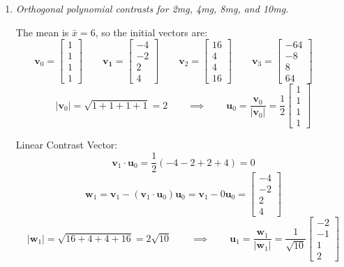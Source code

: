 \documentclass[11pt]{article}
\begin{document}
\begin{enumerate}
\pagebreak
\item %
\emph{Orthogonal polynomial contrasts for 2mg, 4mg, 8mg, and 10mg.}

The mean is \(\bar{x}=6\), so the initial vectors are:
\begin{equation*}
\mathbf{v}_0=\begin{bmatrix}1 \\ 1 \\ 1 \\ 1\end{bmatrix}\qquad
\mathbf{v_1}=\begin{bmatrix}-4 \\ -2 \\ 2 \\ 4\end{bmatrix}\qquad
\mathbf{v}_2=\begin{bmatrix}16 \\ 4 \\ 4 \\ 16\end{bmatrix}\qquad
\mathbf{v}_3=\begin{bmatrix}-64 \\ -8 \\ 8 \\ 64\end{bmatrix}\qquad
\end{equation*}
\begin{equation*}
|\mathbf{v}_0|=\sqrt{1+1+1+1}=2\qquad\implies\qquad
\mathbf{u}_0=\frac{\mathbf{v}_0}{|\mathbf{v}_0|}=\frac{1}{2}\begin{bmatrix}1 \\ 1 \\ 1 \\ 1\end{bmatrix}
\end{equation*}

Linear Contrast Vector:
\begin{equation*}
\mathbf{v}_1\cdot\mathbf{u}_0=\frac{1}{2}(-4-2+2+4)=0
\end{equation*}
\begin{equation*}
\mathbf{w}_1=\mathbf{v}_1-(\mathbf{v}_1\cdot\mathbf{u}_0)\mathbf{u}_0=\mathbf{v}_1-0\mathbf{u}_0=\begin{bmatrix}-4 \\ -2 \\ 2 \\ 4\end{bmatrix}
\end{equation*}
\begin{equation*}
|\mathbf{w}_1|=\sqrt{16+4+4+16}=2\sqrt{10}\qquad\implies\qquad
\mathbf{u}_1=\frac{\mathbf{w}_1}{|\mathbf{w}_1|}=\frac{1}{\sqrt{10}}\begin{bmatrix}-2 \\ -1 \\ 1 \\ 2\end{bmatrix}
\end{equation*}


\end{enumerate}
\end{document}
